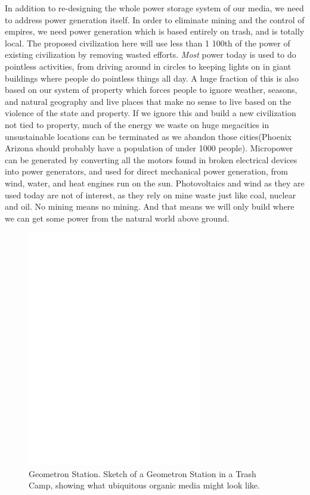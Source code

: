 In addition to re-designing the whole power storage system of our media, we need to address power generation itself.  In order to eliminate mining and the control of empires, we need power generation which is based entirely on trash, and is totally local.  The proposed civilization here will use less than 1 100th of the power of existing civilization by removing wasted efforts.  \emph{Most} power today is used to do pointless activities, from driving around in circles to keeping lights on in giant buildings where people do pointless things all day.  A huge fraction of this is also based on our system of property which forces people to ignore weather, seasons, and natural geography and live places that make no sense to live based on the violence of the state and property.  If we ignore this and build a new civilization not tied to property, much of the energy we waste on huge megacities in unsustainable locations can be terminated as we abandon those cities(Phoenix Arizona should probably have a population of under 1000 people).  Micropower can be generated by converting all the motors found in broken electrical devices into power generators, and used for direct mechanical power generation, from wind, water, and heat engines run on the sun.  Photovoltaics and wind as they are used today are not of interest, as they rely on mine waste just like coal, nuclear and oil.  No mining means no mining.  And that means we will only build where we can get some power from the natural world above ground.

\begin{figure}
	\centering
	\includegraphics[width=3in]{figures/shapes/blank.png}
    \caption[geometronstation]
	{Geometron Station. Sketch of a Geometron Station in a Trash Camp, showing what ubiquitous organic media might look like.} 
\end{figure}


